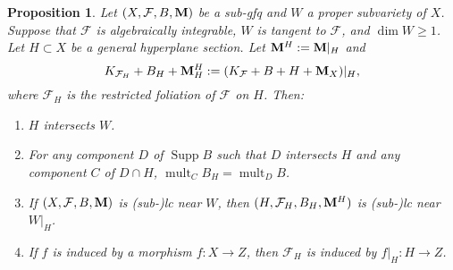 \documentclass[11pt]{amsart}
\numberwithin{equation}{section}
\newcommand{\Mm}{{\bf{M}}}
\newcommand{\Supp}{\operatorname{Supp}}
\newcommand{\mult}{\operatorname{mult}}
\newcommand{\Ff}{\mathcal{F}}
\newtheorem{prop}[thm]{Proposition}
\theoremstyle{definition}
\theoremstyle{definition}
\theoremstyle{definition}
\begin{document}
\begin{prop}\label{prop: general hyperplane non-invariant}
Let $(X,\Ff,B,\Mm)$ be a sub-gfq and $W$ a proper subvariety of $X$. Suppose that $\Ff$ is algebraically integrable, $W$ is tangent to $\Ff$, and $\dim W\geq 1$. Let $H\subset X$ be a general hyperplane section. Let $\Mm^H:=\Mm|_H$ and $$K_{\Ff_H}+B_H+\Mm^H_H:=(K_{\Ff}+B+H+\Mm_X)|_H,$$ where $\Ff_H$ is the restricted foliation of $\Ff$ on $H$. Then:
\begin{enumerate}
    \item $H$ intersects $W$.
    \item For any component $D$ of $\Supp B$ such that $D$ intersects $H$ and any component $C$ of $D\cap H$, $\mult_CB_H=\mult_DB$.
    \item  If $(X,\Ff,B,\Mm)$ is (sub-)lc near $W$, then $(H,\Ff_H,B_H,\Mm^H)$ is (sub-)lc near $W|_H$.
    \item If $f$ is induced by a morphism $f: X\rightarrow Z$, then $\Ff_H$ is induced by $f|_H: H\rightarrow Z$.
\end{enumerate}
\end{prop}
\end{document}
